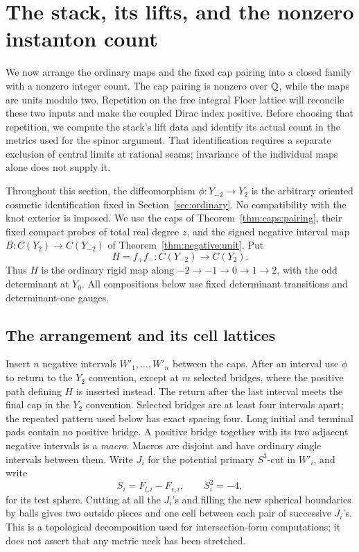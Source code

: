 \section{The stack, its lifts, and the nonzero instanton count}
\label{sec:stack}

We now arrange the ordinary maps and the fixed cap pairing into a closed
family with a nonzero integer count.  The cap pairing is nonzero over
\(\mathbb Q\), while the maps are units modulo two.  Repetition on the free
integral Floer lattice will reconcile these two inputs and make the
coupled Dirac index positive.  Before choosing that repetition, we compute
the stack's lift data and identify its actual count in the metrics used
for the spinor argument.  That identification requires a separate
exclusion of central limits at rational seams; invariance of the
individual maps alone does not supply it.

Throughout this section, the diffeomorphism
\(\phi:Y_{-2}\longrightarrow Y_2\) is the arbitrary oriented cosmetic
identification fixed in Section~\ref{sec:ordinary}.  No compatibility with
the knot exterior is imposed.  We use the caps of
Theorem~\ref{thm:caps:pairing}, their fixed compact probes of total real
degree \(z\), and the signed negative interval map
\(B:C(Y_2)\longrightarrow C(Y_{-2})\) of
Theorem~\ref{thm:negative:unit}.  Put
\[
 H=f_+f_-:C(Y_{-2})\longrightarrow C(Y_2).
\]
Thus \(H\) is the ordinary rigid map along
\(-2\to-1\to0\to1\to2\), with the odd determinant at \(Y_0\).
All compositions below use fixed determinant transitions and
determinant-one gauges.

\subsection{The arrangement and its cell lattices}

Insert \(n\) negative intervals \(W'_1,\ldots,W'_n\) between the caps.
After an interval use \(\phi\) to return to the \(Y_2\) convention,
except at \(m\) selected bridges, where the positive path defining
\(H\) is inserted instead.  The return after the last interval meets
the final cap in the \(Y_2\) convention.  Selected bridges are at least
four intervals apart; the repeated pattern used below has exact spacing
four.  Long initial and terminal pads contain no positive bridge.
A positive bridge together with its two
adjacent negative intervals is a \emph{macro}.  Macros are disjoint and
have ordinary single intervals between them.  Write \(J_i\) for the
potential primary \(S^3\)-cut in \(W'_i\), and write
\[
 S_i=F_{l,i}-F_{r,i},\qquad S_i^2=-4,
\]
for its test sphere.  Cutting at all the \(J_i\)'s and filling the new
spherical boundaries by balls gives two outside pieces and one cell
between each pair of successive \(J_i\)'s.  This is a topological
decomposition used for intersection-form computations; it does not
assert that any metric neck has been stretched.

